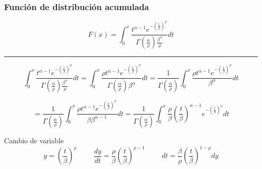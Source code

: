 \begin{frame}
    \frametitle{Función de distribución acumulada}

    \begin{equation*}
        F(x) = \int_{0}^{x} \frac{t^{\alpha - 1} e^{-\left(\frac{t}{\beta}\right)^{\rho}}}{\Gamma \left( \frac{\alpha}{\rho} \right) \frac{\beta^\alpha}{\rho}} dt
    \end{equation*}

    \hrule
    \vspace{0.5cm}

    \begin{equation*}
        \int_{0}^{x} \frac{t^{\alpha - 1} e^{-\left(\frac{t}{\beta}\right)^{\rho}}}{\Gamma \left( \frac{\alpha}{\rho} \right) \frac{\beta^\alpha}{\rho}} dt
        = \int_{0}^{x} \frac{\rho t^{\alpha - 1} e^{-\left(\frac{t}{\beta}\right)^{\rho}}}{\Gamma \left( \frac{\alpha}{\rho} \right) \beta^\alpha} dt
        = \frac{1}{\Gamma \left( \frac{\alpha}{\rho} \right)}\int_{0}^{x} \frac{\rho t^{\alpha - 1} e^{-\left(\frac{t}{\beta}\right)^{\rho}}}{\beta^\alpha} dt
    \end{equation*}

    \begin{equation*}
        = \frac{1}{\Gamma \left( \frac{\alpha}{\rho} \right)}\int_{0}^{x} \frac{\rho t^{\alpha - 1} e^{-\left(\frac{t}{\beta}\right)^{\rho}}}{\beta \beta^{\alpha-1}} dt
        = \frac{1}{\Gamma \left( \frac{\alpha}{\rho} \right)}\int_{0}^{x} \frac{\rho}{\beta} \left( \frac{t}{\beta} \right) ^{\alpha - 1} e^{-\left(\frac{t}{\beta}\right)^{\rho}} dt
    \end{equation*}
\end{frame}

\begin{frame}
    \begin{block}{Cambio de variable}
        \begin{equation*}
            y = \left( \frac{t}{\beta} \right)^\rho
            \hspace{1cm}
            \frac{dy}{dt} = \frac{\rho}{\beta} \left( \frac{t}{\beta} \right)^{\rho-1}
            \hspace{1cm}
            {dt} = \frac{\beta}{\rho} \left( \frac{t}{\beta} \right)^{1-\rho} dy
        \end{equation*}
    \end{block}
\end{frame}

